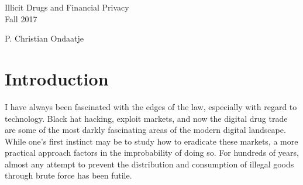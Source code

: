 \documentclass[12pt]{article}
\begin{document}
		
\begin{titlepage}
\vspace*{\fill}
\begin{center}
{\LARGE Illicit Drugs and Financial Privacy}\\ [1.5cm]

Fall 2017

P. Christian Ondaatje
\end{center}
\vspace*{\fill}

\end{titlepage}

\setlength\parindent{0pt}

\setcounter{secnumdepth}{-1}









\pagebreak
\section{Introduction}

I have always been fascinated with the edges of the law, especially with regard to technology. Black hat hacking, exploit markets, and now the digital drug trade are some of the most darkly fascinating areas of the modern digital landscape. While one's first instinct may be to study how to eradicate these markets, a more practical approach factors in the improbability of doing so. For hundreds of years, almost any attempt to prevent the distribution and consumption of illegal goods through brute force has been futile. 
\end{document}
